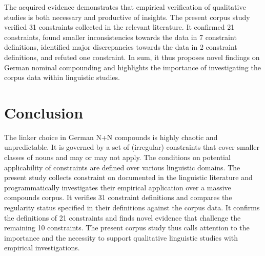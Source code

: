 \documentclass[10pt, a4paper]{article}
\begin{document}
The acquired evidence demonstrates that empirical verification of qualitative studies is both necessary and productive of insights. The present corpus study verified 31 constraints collected in the relevant literature. It confirmed 21 constraints, found smaller inconsistencies towards the data in 7 constraint definitions, identified major discrepancies towards the data in 2 constraint definitions, and refuted one constraint. In sum, it thus proposes novel findings on German nominal compounding and highlights the importance of investigating the corpus data within linguistic studies.




\section{Conclusion}
\label{sec:outro}

The linker choice in German N+N compounds is highly chaotic and unpredictable. It is governed by a set of (irregular) constraints that cover smaller classes of nouns and may or may not apply. The conditions on potential applicability of constraints are defined over various linguistic domains. The present study collects constraint on documented in the linguistic literature and programmatically investigates their empirical application over a massive compounds corpus. It verifies 31 constraint definitions and compares the regularity status specified in their definitions against the corpus data. It confirms the definitions of 21 constraints and finds novel evidence that challenge the remaining 10 constraints. The present corpus study thus calls attention to the importance and the necessity to support qualitative linguistic studies with empirical investigations.
\end{document}
